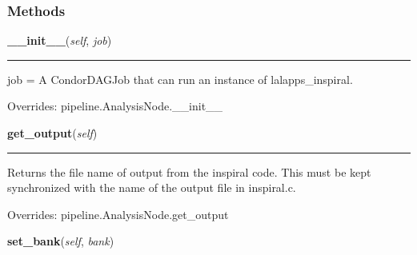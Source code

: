   \subsubsection{Methods}

    \label{inspiral:InspiralNode:__init__}
    \vspace{0.5ex}

    \noindent\begin{boxedminipage}{\textwidth}

    \raggedright \textbf{\_\_init\_\_}(\textit{self}, \textit{job})

    \vspace{-1.5ex}

    \rule{\textwidth}{0.5\fboxrule}
    job = A CondorDAGJob that can run an instance of lalapps\_inspiral.

    \vspace{1ex}

      Overrides: pipeline.AnalysisNode.\_\_init\_\_

    \end{boxedminipage}

    \label{inspiral:InspiralNode:get_output}
    \vspace{0.5ex}

    \noindent\begin{boxedminipage}{\textwidth}

    \raggedright \textbf{get\_output}(\textit{self})

    \vspace{-1.5ex}

    \rule{\textwidth}{0.5\fboxrule}
    Returns the file name of output from the inspiral code. This must be 
    kept synchronized with the name of the output file in inspiral.c.

    \vspace{1ex}

      Overrides: pipeline.AnalysisNode.get\_output

    \end{boxedminipage}

    \label{inspiral:InspiralNode:set_bank}
    \vspace{0.5ex}

    \noindent\begin{boxedminipage}{\textwidth}

    \raggedright \textbf{set\_bank}(\textit{self}, \textit{bank})

    \end{boxedminipage}

